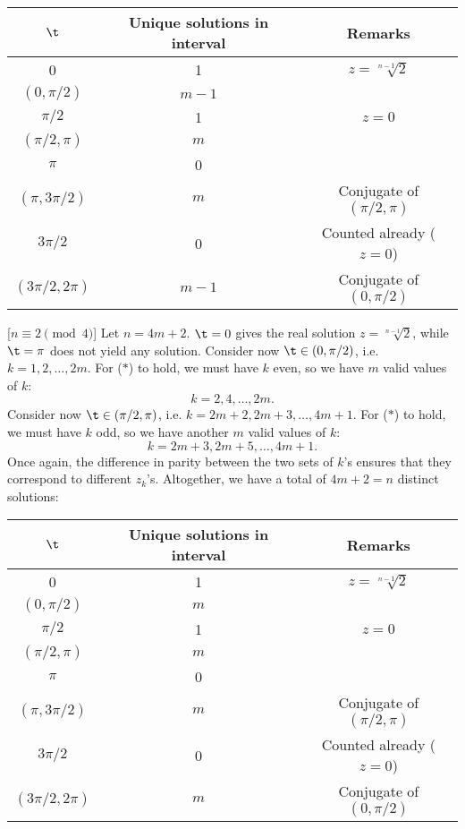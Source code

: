 \begin{solution}
    \begin{table}[H]
        \centering
        \begin{tabular}{|c|c|c|}
        \hline
        $\t$ & Unique solutions in interval & Remarks \\ \hline\hline
        0 & 1 & $z = \sqrt[n-1]{2}$ \\ \hline
        $(0, \pi/2)$ & $m-1$ &  \\ \hline
        $\pi/2$ & 1 & $z = 0$ \\ \hline
        $(\pi/2, \pi)$ & $m$ &  \\ \hline
        $\pi$ & 0 &  \\ \hline
        $(\pi, 3\pi/2)$ & $m$ &  Conjugate of $(\pi/2, \pi)$\\ \hline
        $3\pi/2$ & 0 & Counted already ($z = 0$) \\ \hline
        $(3\pi/2, 2\pi)$ & $m-1$ & Conjugate of $(0, \pi/2)$ \\ \hline
        \end{tabular}
    \end{table}

    [$n \equiv 2 \pmod{4}$] Let $n = 4m + 2$. $\t = 0$ gives the real solution $z = \sqrt[n-1]{2}$, while $\t = \pi$ does not yield any solution. Consider now $\t \in (0, \pi/2)$, i.e. $k = 1, 2, \dots, 2m$. For ($\ast$) to hold, we must have $k$ even, so we have $m$ valid values of $k$: \[k = 2, 4, \dots, 2m.\] Consider now $\t \in (\pi/2, \pi)$, i.e. $k = 2m+2, 2m+3, \dots, 4m+1$. For ($\ast$) to hold, we must have $k$ odd, so we have another $m$ valid values of $k$: \[k = 2m+3, 2m+5, \dots, 4m+1.\] Once again, the difference in parity between the two sets of $k$'s ensures that they correspond to different $z_k$'s. Altogether, we have a total of $4m+2 = n$ distinct solutions:

    \begin{table}[H]
        \centering
        \begin{tabular}{|c|c|c|}
        \hline
        $\t$ & Unique solutions in interval & Remarks \\ \hline\hline
        0 & 1 & $z = \sqrt[n-1]{2}$ \\ \hline
        $(0, \pi/2)$ & $m$ &  \\ \hline
        $\pi/2$ & 1 & $z = 0$ \\ \hline
        $(\pi/2, \pi)$ & $m$ &  \\ \hline
        $\pi$ & 0 &  \\ \hline
        $(\pi, 3\pi/2)$ & $m$ &  Conjugate of $(\pi/2, \pi)$\\ \hline
        $3\pi/2$ & 0 & Counted already ($z = 0$) \\ \hline
        $(3\pi/2, 2\pi)$ & $m$ & Conjugate of $(0, \pi/2)$ \\ \hline
        \end{tabular}
    \end{table}


\end{solution}
